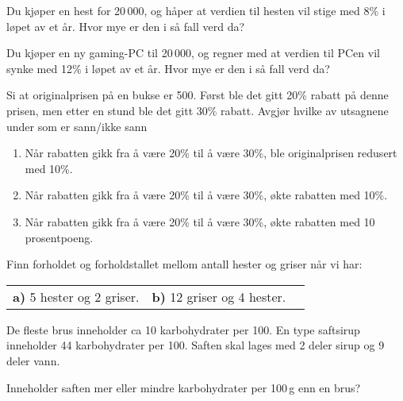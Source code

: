  \vs
{}
Du kjøper en hest for 20\,000, og håper at verdien til hesten vil stige med 8\% i løpet av et år. Hvor mye er den i så fall verd da?

Du kjøper en ny gaming-PC til 20\,000, og regner med at verdien til PCen vil synke med 12\% i løpet av et år. Hvor mye er den i så fall verd da?

Si at originalprisen på en bukse er 500. Først ble det gitt 20\% rabatt på denne prisen, men etter en stund ble det gitt 30\% rabatt. Avgjør hvilke av utsagnene under som er sann/ikke sann
\begin{enumerate}[label=(\roman*)]
	\item Når rabatten gikk fra å være 20\% til å være 30\%, ble originalprisen redusert med 10\%.
	\item Når rabatten gikk fra å være 20\% til å være 30\%, økte rabatten med 10\%.
	\item Når rabatten gikk fra å være 20\% til å være 30\%, økte rabatten med 10 prosentpoeng.	
\end{enumerate}

\nes

 \vs
{}

 \vs
{}

Finn forholdet og forholdstallet mellom antall hester og griser når vi har:\os
\begin{tabular}{@{}l l l}	
	\textbf{a)} 5 hester og 2 griser. &\textbf{b)} 12 griser og 4 hester.
\end{tabular}

\newpage
{}


\vsk \vspace{12pt}
\begin{comment}
Oppgave om hvilket dyr som er sterkest i forhold til vekten. Skaraben er verdens sterkeste.
\end{comment}




De fleste brus inneholder ca 10 karbohydrater per 100. En type saftsirup inneholder 44 karbohydrater per 100. Saften skal lages med 2 deler sirup og 9 deler vann. \os

Inneholder saften mer eller mindre karbohydrater per 100\,g enn en brus? \os





